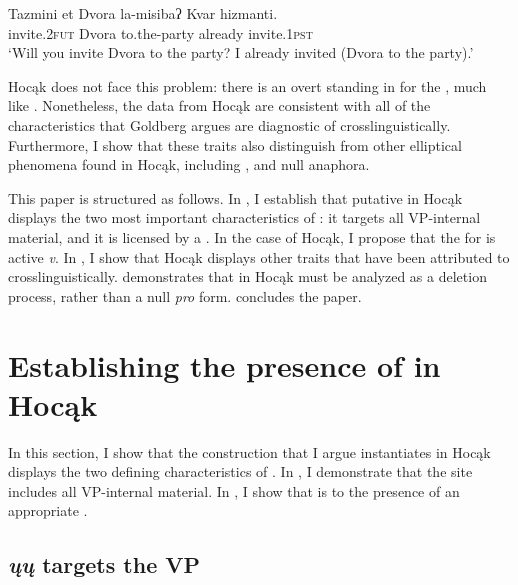 \documentclass[output=paper]{LSP/langsci}
\begin{document}
\ea\label{ex:johnson:2}
\gll Tazmini {et Dvora} la-misibaʔ Kvar hizmanti.\\
invite.\textsc{2fut} Dvora to.the-party already invite.\textsc{1pst}\\
\trans `Will you invite Dvora to the party? I already invited (Dvora to the party).' \\\citep[14]{Goldberg2005}
\z 

Hocąk  does not face this problem: there is an overt  standing in for the , much like  . Nonetheless, the data from Hocąk are consistent with all of the characteristics that Goldberg argues are diagnostic of  crosslinguistically. Furthermore, I show that these traits also distinguish  from other elliptical phenomena found in Hocąk, including ,  and null  anaphora. 

This paper is structured as follows. In , I establish that putative  in Hocąk displays the two most important characteristics of : it targets all VP-internal material, and it is licensed by a . In the case of Hocąk, I propose that the  for  is active \emph{v}. In , I show that Hocąk  displays other traits that have been attributed to  crosslinguistically.  demonstrates that  in Hocąk must be analyzed as a deletion process, rather than a null \emph{pro} form.  concludes the paper.

\section{Establishing the presence of  in Hocąk}\label{sec:johnson:2}

In this section, I show that the construction that I argue instantiates  in Hocąk displays the two defining characteristics of . In , I demonstrate that the  site includes all VP-internal material. In , I show that  is  to the presence of an appropriate .

\subsection{\emph{ųų} targets the VP}\label{sec:johnson:2.1}
\end{document}
